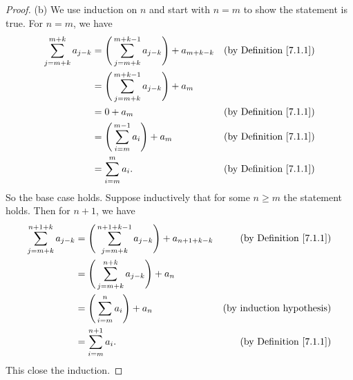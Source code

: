 \begin{proof}{(b)}
We use induction on \(n\) and start with \(n = m\) to show the statement is true.
For \(n = m\), we have
\begin{align*}
\sum_{j = m + k}^{m + k} a_{j - k} &= \Bigg(\sum_{j = m + k}^{m + k - 1} a_{j - k}\Bigg) + a_{m + k - k} & \text{(by Definition \ref{7.1.1})} \\
&= \Bigg(\sum_{j = m + k}^{m + k - 1} a_{j - k}\Bigg) + a_m \\
&= 0 + a_m & \text{(by Definition \ref{7.1.1})} \\
&= \Bigg(\sum_{i = m}^{m - 1} a_i\Bigg) + a_m & \text{(by Definition \ref{7.1.1})} \\
&= \sum_{i = m}^m a_i. & \text{(by Definition \ref{7.1.1})}
\end{align*}
So the base case holds.
Suppose inductively that for some \(n \geq m\) the statement holds.
Then for \(n + 1\), we have
\begin{align*}
\sum_{j = m + k}^{n + 1 + k} a_{j - k} &= \Bigg(\sum_{j = m + k}^{n + 1 + k - 1} a_{j - k}\Bigg) + a_{n + 1 + k - k} & \text{(by Definition \ref{7.1.1})} \\
&= \Bigg(\sum_{j = m + k}^{n + k} a_{j - k}\Bigg) + a_n \\
&= \Bigg(\sum_{i = m}^n a_i\Bigg) + a_n & \text{(by induction hypothesis)} \\
&= \sum_{i = m}^{n + 1} a_i. & \text{(by Definition \ref{7.1.1})}
\end{align*}
This close the induction.
\end{proof}

